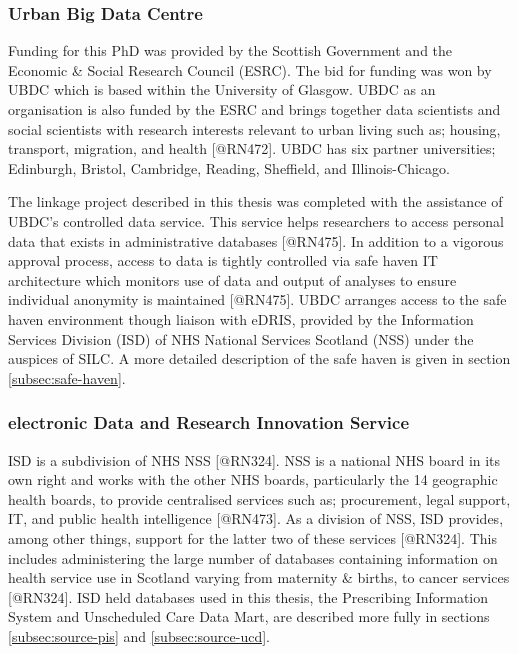 \documentclass[]{article}
\begin{document}
\subsubsection{Urban Big Data Centre}\label{subsec:ubdc}

Funding for this PhD was provided by the Scottish Government and the
Economic \& Social Research Council (ESRC). The bid for funding was won
by UBDC which is based within the University of Glasgow. UBDC as an
organisation is also funded by the ESRC and brings together data
scientists and social scientists with research interests relevant to
urban living such as; housing, transport, migration, and health
{[}@RN472{]}. UBDC has six partner universities; Edinburgh, Bristol,
Cambridge, Reading, Sheffield, and Illinois-Chicago.

The linkage project described in this thesis was completed with the
assistance of UBDC's controlled data service. This service helps
researchers to access personal data that exists in administrative
databases {[}@RN475{]}. In addition to a vigorous approval process,
access to data is tightly controlled via safe haven IT architecture
which monitors use of data and output of analyses to ensure individual
anonymity is maintained {[}@RN475{]}. UBDC arranges access to the safe
haven environment though liaison with eDRIS, provided by the Information
Services Division (ISD) of NHS National Services Scotland (NSS) under
the auspices of SILC. A more detailed description of the safe haven is
given in section \ref{subsec:safe-haven}.

\subsubsection{electronic Data and Research Innovation Service}\label{subsec:edris}

ISD is a subdivision of NHS NSS {[}@RN324{]}. NSS is a national NHS
board in its own right and works with the other NHS boards, particularly
the 14 geographic health boards, to provide centralised services such
as; procurement, legal support, IT, and public health intelligence
{[}@RN473{]}. As a division of NSS, ISD provides, among other things,
support for the latter two of these services {[}@RN324{]}. This includes
administering the large number of databases containing information on
health service use in Scotland varying from maternity \& births, to
cancer services {[}@RN324{]}. ISD held databases used in this thesis,
the Prescribing Information System and Unscheduled Care Data Mart, are
described more fully in sections \ref{subsec:source-pis} and
\ref{subsec:source-ucd}.
\end{document}
